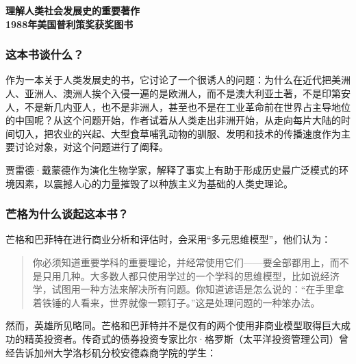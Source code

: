\cleardoublepage
{}


\begin{BookSummaryBox}
{\centering \textbf{理解人类社会发展史的重要著作\\  1988年美国普利策奖获奖图书}\par}
\end{BookSummaryBox}

\subsubsection*{这本书谈什么？}

作为一本关于人类发展史的书，它讨论了一个很诱人的问题：为什么在近代把美洲人、亚洲人、澳洲人挨个入侵一遍的是欧洲人，而不是澳大利亚土著，不是印第安人，不是新几内亚人，也不是非洲人，甚至也不是在工业革命前在世界占主导地位的中国呢？从这个问题开始，作者试着从人类走出非洲开始，从走向每片大陆的时间切入，把农业的兴起、大型食草哺乳动物的驯服、发明和技术的传播速度作为主要讨论对象，对这个问题进行了阐释。
\par

贾雷德·戴蒙德作为演化生物学家，解释了事实上有助于形成历史最广泛模式的环境因素，以震撼人心的力量摧毁了以种族主义为基础的人类史理论。
\par

\subsubsection*{芒格为什么谈起这本书？}

芒格和巴菲特在进行商业分析和评估时，会采用“多元思维模型”，他们认为：
\par

\begin{quotation}
你必须知道重要学科的重要理论，并经常使用它们——要全部都用上，而不是只用几种。大多数人都只使用学过的一个学科的思维模型，比如说经济学，试图用一种方法来解决所有问题。你知道谚语是怎么说的：“在手里拿着铁锤的人看来，世界就像一颗钉子。”这是处理问题的一种笨办法。
\par
\end{quotation}

然而，英雄所见略同。芒格和巴菲特并不是仅有的两个使用非商业模型取得巨大成功的精英投资者。传奇式的债券投资专家比尔·格罗斯（太平洋投资管理公司）曾经告诉加州大学洛杉矶分校安德森商学院的学生：
\par

